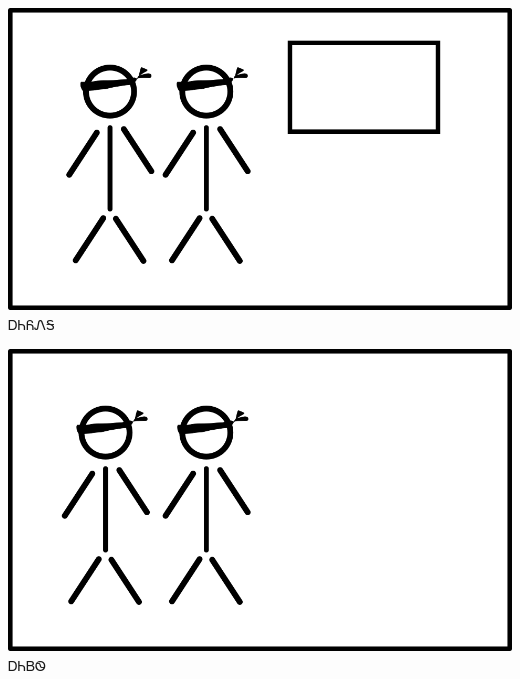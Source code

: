 \documentclass[avery5371]{flashcards}%
\begin{document}
\begin{flashcard}{
\includegraphics[width=0.95\columnwidth,height=.51\columnwidth,keepaspectratio]{../artwork/flags/aniyonega-flag-blind}
}\Huge ᎠᏂᏲᏁᎦ
\end{flashcard}

\begin{flashcard}{
\includegraphics[width=0.95\columnwidth,height=.51\columnwidth,keepaspectratio]{../artwork/flags/aniyvwi-no-flag-blind}
}\Huge ᎠᏂᏴᏫ
\end{flashcard}
\end{document}
